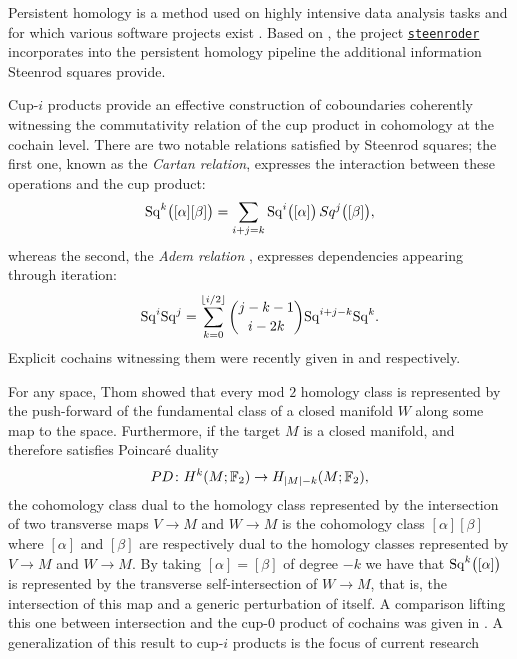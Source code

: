 \begin{remark*}
	Persistent homology is a method used on highly intensive data analysis tasks \cite{carlsson2008images, chan2013viral, lee2017quantifying} and for which various software projects exist \cite{bauer2021ripser, gudhi, medina2021giotto}.
	Based on \cite{medina2018persistence}, the project \href{https://github.com/Steenroder/steenroder}{\texttt{steenroder}} incorporates into the persistent homology pipeline the additional information Steenrod squares provide.
\end{remark*}

\begin{remark*}[Relations]
	Cup-$i$ products provide an effective construction of coboundaries coherently witnessing the commutativity relation of the cup product in cohomology at the cochain level.
	There are two notable relations satisfied by Steenrod squares;
	the first one, known as the \textit{Cartan relation}, expresses the interaction between these operations and the cup product:
	\begin{equation*}
	\mathrm{Sq}^k \big( [\alpha] [\beta] \big) =
	\sum_{i+j=k} \mathrm{Sq}^i \big( [\alpha]\big)\, Sq^j \big([\beta] \big),
	\end{equation*}
	whereas the second, the \textit{Adem relation} \cite{adem1952iteration}, expresses dependencies appearing through iteration:
	\begin{equation*}
	\mathrm{Sq}^i \mathrm{Sq}^j =
	\sum_{k=0}^{\lfloor i/2 \rfloor} \binom{j-k-1}{i-2k} \mathrm{Sq}^{i+j-k} \mathrm{Sq}^k.
	\end{equation*}
	Explicit cochains witnessing them were recently given in \cite{medina2020cartan} and \cite{medina2021adem} respectively.
\end{remark*}

\begin{remark*}
	For any space, Thom showed that every mod $2$ homology class is represented by the push-forward of the fundamental class of a closed manifold $W$ along some map to the space.
	Furthermore, if the target $M$ is a closed manifold, and therefore satisfies Poincar\'{e} duality
	\[
	PD \colon H^k(M ;{\mathbb{F}_2}) \to H_{\lvert M\rvert-k}(M; {\mathbb{F}_2}),
	\]
	the cohomology class dual to the homology class represented by the intersection of two transverse maps $V \to M$ and $W \to M$ is the cohomology class $[\alpha] [\beta]$ where $[\alpha]$ and $[\beta]$ are respectively dual to the homology classes represented by $V \to M$ and $W \to M$.
	By taking $[\alpha] = [\beta]$ of degree $-k$ we have that $\mathrm{Sq}^k \big( [\alpha] \big)$ is represented by the transverse self-intersection of $W \to M$, that is, the intersection of this map and a generic perturbation of itself.
	A comparison lifting this one between intersection and the cup-$0$ product of cochains was given in \cite{medina2021flowing}.
	A generalization of this result to \mbox{cup-$i$} products is the focus of current research \cite{medina2022foundations}
\end{remark*}

